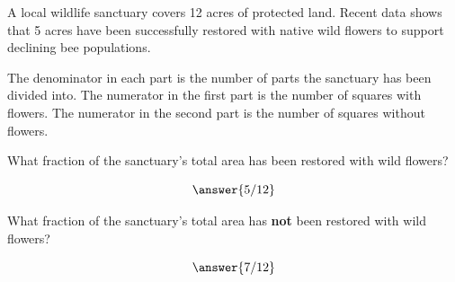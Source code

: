 \documentclass[handout, font=12pt]{ximera}
\begin{document}
\begin{problem}  A local wildlife sanctuary covers 12 acres of protected land.  Recent data shows that 5 acres have been successfully restored with native wild flowers to support declining bee populations.


\begin{center}

\end{center}

\begin{hint}
The denominator in each part is the number of parts the sanctuary has been divided into.  The numerator in the first part is
the number of squares with flowers. The numerator in the second part is the number of squares without flowers.
\end{hint}

What fraction of the sanctuary's total area has been restored with wild flowers?

\[ \answer{5/12} \] 


What fraction of the sanctuary's total area has \textbf{not} been restored with wild flowers?

\[ \answer{7/12} \] 

\end{problem}
\end{document}
